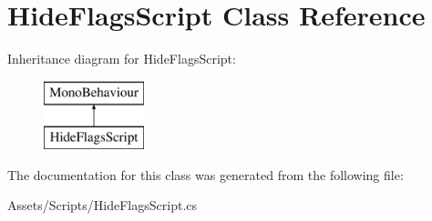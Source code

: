 \hypertarget{class_hide_flags_script}{}\section{Hide\+Flags\+Script Class Reference}
\label{class_hide_flags_script}
Inheritance diagram for Hide\+Flags\+Script\+:\begin{figure}[H]
\begin{center}
\leavevmode
\includegraphics[height=2.000000cm]{class_hide_flags_script}
\end{center}
\end{figure}


The documentation for this class was generated from the following file\+:\begin{DoxyCompactItemize}
\item 
Assets/\+Scripts/Hide\+Flags\+Script.\+cs\end{DoxyCompactItemize}
